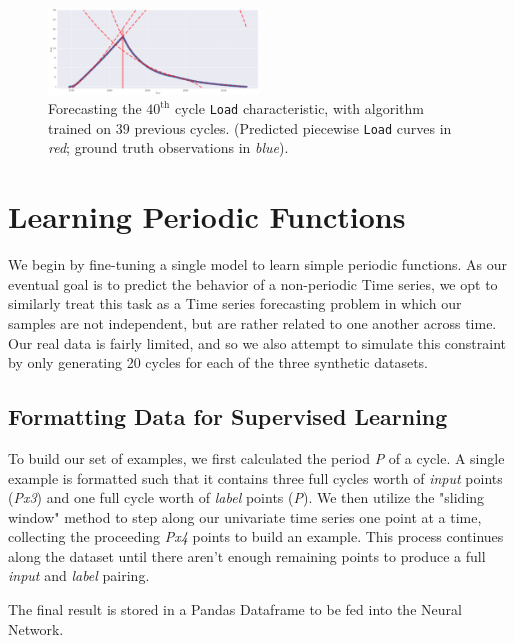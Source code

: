 \documentclass[letterpaper, 10 pt, conference]{ieeeconf}  %
\begin{document}
\label{Redblue}
\begin{figure}[h!]
	\centering
	\includegraphics[width=0.5\textwidth]{assets/piecewise_fit.png}
  \caption{Forecasting the $40^{\text{th}}$ cycle \texttt{Load} characteristic, with algorithm trained on $39$ previous cycles. (Predicted piecewise \texttt{Load} curves in \textit{red}; ground truth observations in \textit{blue}).}
\end{figure}


\section{Learning Periodic Functions}
We begin by fine-tuning a single model to learn simple periodic functions. As our eventual goal is to predict the behavior of a non-periodic Time series, we opt to similarly treat this task as a Time series forecasting problem in which our samples are not independent, but are rather related to one another across time. Our real data is fairly limited, and so we also attempt to simulate this constraint by only generating 20 cycles for each of the three synthetic datasets.


\subsection{Formatting Data for Supervised Learning}
To build our set of examples, we first calculated the period \textit{P} of a cycle. A single example is formatted such that it contains three full cycles worth of \textit{input} points (\textit{Px3}) and one full cycle worth of \textit{label} points (\textit{P}). We then utilize the "sliding window" method to step along our univariate time series one point at a time, collecting the proceeding \textit{Px4} points to build an example. This process continues along the dataset until there aren't enough remaining points to produce a full \textit{input} and \textit{label} pairing.

The final result is stored in a Pandas Dataframe to be fed into the Neural Network.
\end{document}
